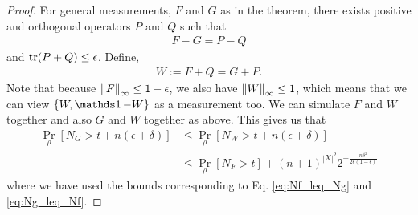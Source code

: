 \documentclass[11pt, oneside]{article}   	%
\begin{document}
\begin{proof}
    For general measurements, $F$ and $G$ as in the theorem, there exists positive and orthogonal operators $P$ and $Q$ such that  
    \begin{align}
        F - G = P - Q 
    \end{align}
    and $\operatorname{tr}(P+Q) \leq \epsilon$. Define, 
    \begin{align}
        W := F + Q = G + P.
    \end{align}
    Note that because $\left\Vert F \right\Vert_\infty \leq 1- \epsilon$, we also have $\left\Vert W \right\Vert_\infty \leq 1$, which means that we can view $\{W, \Id- W\}$ as a measurement too. We can simulate $F$ and $W$ together and also $G$ and $W$ together as above. This gives us that 
    \begin{align*}
        \Pr_\rho[N_G > t + n(\epsilon+\delta)] &\leq \Pr_\rho[N_W > t+ n(\epsilon+\delta)] \\
        & \leq \Pr_\rho[N_F > t] + (n+1)^{|X|^2} 2^{- \frac{n \delta^2}{2\epsilon(1- \epsilon)}}
    \end{align*}
    where we have used the bounds corresponding to Eq. \ref{eq:Nf_leq_Ng} and \ref{eq:Ng_leq_Nf}.
\end{proof}
\end{document}
